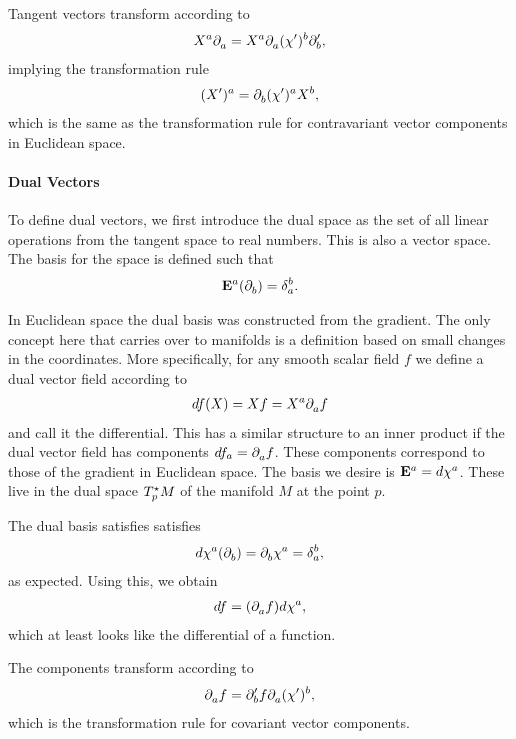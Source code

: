 Tangent vectors transform according to
\begin{align*}
	X^{a}\del{a}{} = X^{a}\del{a}{(\chi^{\prime})^{b}}\del[\prime]{b}{},
\end{align*}
implying the transformation rule
\begin{align*}
	(X^{\prime})^{a} = \del{b}{(\chi^{\prime})^{a}}X^{b},
\end{align*}
which is the same as the transformation rule for contravariant vector components in Euclidean space.

\paragraph{Dual Vectors}
To define dual vectors, we first introduce the dual space as the set of all linear operations from the tangent space to real numbers. This is also a vector space. The basis for the space is defined such that
\begin{align*}
	\db{a}(\del{b}{}) = \kdelta{b}{a}.
\end{align*}

In Euclidean space the dual basis was constructed from the gradient. The only concept here that carries over to manifolds is a definition based on small changes in the coordinates. More specifically, for any smooth scalar field $f$ we define a dual vector field according to
\begin{align*}
	df(X) = Xf = X^{a}\del{a}{f}
\end{align*}
and call it the differential. This has a similar structure to an inner product if the dual vector field has components $df_{a} = \del{a}{f}$. These components correspond to those of the gradient in Euclidean space. The basis we desire is $\db{a} = d\chi^{a}$. These live in the dual space $\ds{p}{M}$ of the manifold $M$ at the point $p$.

The dual basis satisfies satisfies
\begin{align*}
	d\chi^{a}(\del{b}{}) = \del{b}{\chi^{a}} = \kdelta{b}{a},
\end{align*}
as expected. Using this, we obtain
\begin{align*}
	df = (\del{a}{f})d\chi^{a},
\end{align*}
which at least looks like the differential of a function.

The components transform according to
\begin{align*}
	\del{a}{f} = \del[\prime]{b}{f}\del{a}{(\chi^{\prime})^{b}},
\end{align*}
which is the transformation rule for covariant vector components.

